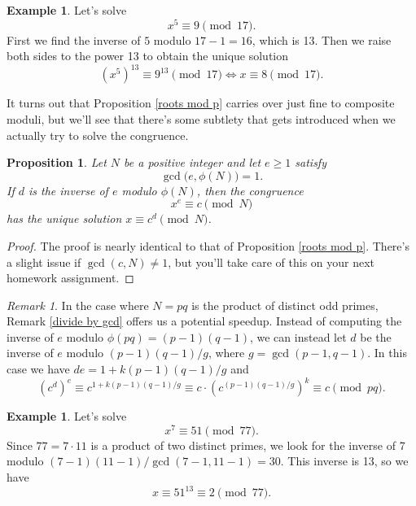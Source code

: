 \documentclass[12pt]{article}
\theoremstyle{plain}
\newtheorem{proposition}[theorem]{Proposition}
\theoremstyle{definition}
\newtheorem{example}[theorem]{Example}
\theoremstyle{remark}
\newtheorem{remark}[theorem]{Remark}
\begin{document}
\begin{example}
    Let's solve
    \[
        x^5\equiv 9\pmod {17}.
    \]
    First we find the inverse of $5$ modulo $17-1=16$, which is 13.
    Then we raise both sides to the power 13 to obtain the unique solution
    \[
        (x^5)^{13}\equiv 9^{13}\pmod{17}\iff x\equiv 8\pmod{17}.
    \]
\end{example}

It turns out that Proposition \ref{roots mod p} carries over just fine to composite moduli, but we'll see that there's some subtlety that gets introduced when we actually try to solve the congruence.

\begin{proposition}
    Let $N$ be a positive integer and let $e\geq 1$ satisfy
    \[
        \gcd\big(e, \phi(N)\big) = 1.
    \]
    If $d$ is the inverse of $e$ modulo $\phi(N)$, then the congruence
    \[
        x^e\equiv c\pmod N
    \]
    has the unique solution $x \equiv c^d\pmod N$.
\end{proposition}
\begin{proof}
    The proof is nearly identical to that of Proposition \ref{roots mod p}.
    There's a slight issue if $\gcd(c, N) \neq 1$, but you'll take care of this on your next homework assignment.
\end{proof}

\begin{remark}
    In the case where $N = pq$ is the product of distinct odd primes, Remark \ref{divide by gcd} offers us a potential speedup.
    Instead of computing the inverse of $e$ modulo $\phi(pq) = (p-1)(q-1)$, we can instead let $d$ be the inverse of $e$ modulo $(p-1)(q-1)/g$, where $g = \gcd(p-1, q-1)$.
    In this case we have $de = 1 + k(p-1)(q-1)/g$ and
    \[
        (c^d)^e \equiv c^{1 + k(p-1)(q-1)/g} \equiv c\cdot (c^{(p-1)(q-1)/g})^k \equiv c\pmod{pq}.
    \]
\end{remark}


\begin{example}
    Let's solve
    \[
        x^7\equiv 51\pmod{77}.
    \]
    Since $77 = 7\cdot 11$ is a product of two distinct primes, we look for the inverse of 7 modulo $(7-1)(11-1)/\gcd(7-1, 11-1) = 30$.
    This inverse is 13, so we have
    \[
        x\equiv 51^{13} \equiv 2\pmod{77}.
    \]
\end{example}
\end{document}
